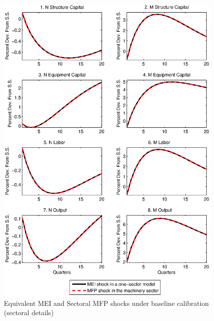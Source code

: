 \documentclass[12pt,fleqn]{article}
\begin{document}
\begin{figure}[tbp] \center
\caption{Equivalent MEI and Sectoral MFP shocks under baseline
calibration (sectoral details)} \label{figure_a2}
\includegraphics[scale=0.9] {figure_a2.ps}
\end{figure}
\end{document}
